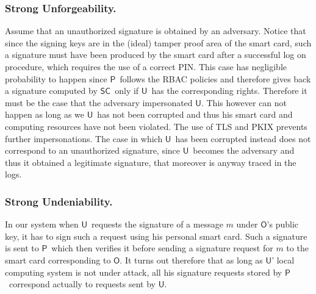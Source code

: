 \documentclass[preprint,authoryear,12pt]{elsarticle}
\newcommand{\Owner}{\ensuremath{\mathsf{O}}}
\newcommand{\SM}{\ensuremath{\mathsf{SM}}}
\newcommand{\User}{\ensuremath{\mathsf{U}}}
\newcommand{\Proxy}{\ensuremath{\mathsf{P}}}
\newcommand{\SC}{\ensuremath{\mathsf{SC}}}
\begin{document}
\subsubsection{Strong Unforgeability.} Assume that an unauthorized signature is obtained by an adversary. Notice that since the signing keys are in the (ideal) tamper proof area of the smart card, such a signature must have been produced by the smart card after a successful log on procedure, which requires the use of a correct PIN. 
This case has negligible probability to happen since \Proxy\ follows the RBAC policies and therefore gives back a signature computed by \SC\ only if \User\ has the corresponding rights. Therefore it must be the case that the adversary impersonated \User. This however can not happen as long as we \User\ has not been corrupted and thus his smart card and computing resources have not been violated. The use of TLS and PKIX prevents further impersonations. The case in which \User\ has been corrupted instead does not correspond to an unauthorized signature, since \User\ becomes the adversary and thus it obtained a legitimate signature, that moreover is anyway traced in the logs.

\subsubsection{Strong Undeniability.} In our system when \User\ requests the signature of a message $m$ under \Owner's public key, it has to sign such a request using his personal smart card.  Such a signature is sent to \Proxy\ which then verifies it before sending a signature request for $m$ to the smart card corresponding to \Owner. It turns out therefore that as long as \User' local computing system is not under attack, all his signature requests stored by \Proxy\ correspond actually to requests sent by \User.
\end{document}
